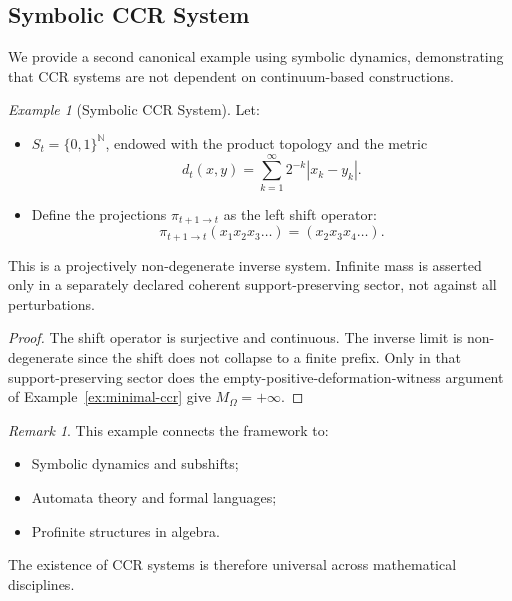 \documentclass[11pt,a4paper]{article}
\theoremstyle{plain}
\theoremstyle{definition}
\theoremstyle{remark}
\newtheorem{remark}[theorem]{Remark}
\newtheorem{example}[theorem]{Example}
\begin{document}
\subsection{Symbolic CCR System}

We provide a second canonical example using symbolic dynamics, demonstrating that CCR systems are not dependent on continuum-based constructions.

\begin{example}[Symbolic CCR System]\label{ex:symbolic-ccr}
Let:
\begin{itemize}[leftmargin=*]
    \item $S_t = \{0, 1\}^{\mathbb{N}}$, endowed with the product topology and the metric
    \begin{equation}
        d_t(x, y) = \sum_{k=1}^{\infty} 2^{-k} |x_k - y_k|.
    \end{equation}
    \item Define the projections $\pi_{t+1 \to t}$ as the left shift operator:
    \begin{equation}
        \pi_{t+1 \to t}(x_1 x_2 x_3 \ldots) = (x_2 x_3 x_4 \ldots).
    \end{equation}
\end{itemize}

This is a projectively non-degenerate inverse system. Infinite mass is asserted only in a separately declared coherent support-preserving sector, not against all perturbations.
\end{example}

\begin{proof}
The shift operator is surjective and continuous. The inverse limit is non-degenerate since the shift does not collapse to a finite prefix. Only in that support-preserving sector does the empty-positive-deformation-witness argument of Example~\ref{ex:minimal-ccr} give $M_\Omega=+\infty$.
\end{proof}

\begin{remark}
This example connects the framework to:
\begin{itemize}[leftmargin=*]
    \item Symbolic dynamics and subshifts;
    \item Automata theory and formal languages;
    \item Profinite structures in algebra.
\end{itemize}
The existence of CCR systems is therefore universal across mathematical disciplines.
\end{remark}
\end{document}
